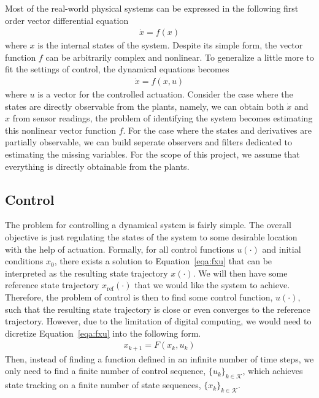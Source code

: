 \documentclass[10pt,twocolumn]{article}
\begin{document}
Most of the real-world physical systems can be expressed in the following first order
vector differential equation
\begin{gather}\label{eqa:fx}
  \dot{x} = f(x)
\end{gather}
where $x$ is the internal states of the system. Despite its simple form, the vector
function $f$ can be arbitrarily complex and nonlinear. To generalize a little more
to fit the settings of control, the dynamical equations becomes
\begin{gather}\label{eqa:fxu}
  \dot{x} = f(x, u)
\end{gather}
where $u$ is a vector for the controlled actuation. Consider the case where the
states are directly observable from the plants, namely, we can obtain both $\dot{x}$
and $x$ from sensor readings, the problem of identifying the system becomes
estimating this nonlinear vector function $f$. For the case where the states
and derivatives are partially observable, we can build seperate observers and filters dedicated
to estimating the missing variables. For the scope of this project, we assume that everything is
directly obtainable from the plants.

\subsection{Control}
The problem for controlling a dynamical system is fairly simple. The overall objective is
just regulating the states of the system to some desirable location with the help of actuation.
Formally, for all control functions $u(\cdot)$ and initial conditions $x_0$, there
exists a solution to Equation~\ref{eqa:fxu} that can be interpreted as the resulting
state trajectory $x(\cdot)$. We will then have some reference state trajectory
$x_{\mathrm{ref}}(\cdot)$ that we would like the system to achieve. Therefore, the
problem of control is then to find some control function, $u(\cdot)$, such that the
resulting state trajectory is close or even converges to the reference trajectory. However,
due to the limitation of digital computing, we would need to dicretize
Equation~\ref{eqa:fxu} into the following form.
\begin{gather}
  x_{k+1} = F(x_k, u_k)
\end{gather}
Then, instead of finding a function defined in an infinite number of time steps, we only need to
find a finite number of control sequence, $\{u_k\}_{k \in \mathcal{K}}$, which achieves
state tracking on a finite number of state sequences, $\{x_k\}_{k \in \mathcal{K}}$.
\end{document}
